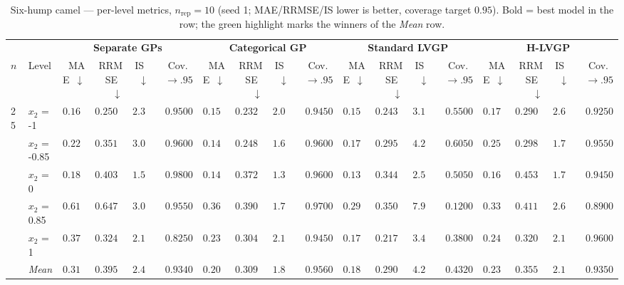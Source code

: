 \begin{table}[htbp]
\centering
\scriptsize
\setlength{\tabcolsep}{2.5pt}
\setlength{\fboxsep}{1pt}
\caption{Six-hump camel --- per-level metrics, $n_{\mathrm{rep}}=10$ (seed 1; MAE/RRMSE/IS lower is better, coverage target $0.95$). Bold = best model in the row; the green highlight marks the winners of the \emph{Mean} row.}
\label{tab:sixhump_camel_nrep10}
\begin{tabular}{llrrrrrrrrrrrrrrrr}
\toprule
 & & \multicolumn{4}{c}{\textbf{Separate GPs}} & \multicolumn{4}{c}{\textbf{Categorical GP}} & \multicolumn{4}{c}{\textbf{Standard LVGP}} & \multicolumn{4}{c}{\textbf{H-LVGP}} \\
\cmidrule(lr){3-6} \cmidrule(lr){7-10} \cmidrule(lr){11-14} \cmidrule(lr){15-18}
$n$ & Level & MAE~$\downarrow$ & RRMSE~$\downarrow$ & IS~$\downarrow$ & Cov.~$\to.95$ & MAE~$\downarrow$ & RRMSE~$\downarrow$ & IS~$\downarrow$ & Cov.~$\to.95$ & MAE~$\downarrow$ & RRMSE~$\downarrow$ & IS~$\downarrow$ & Cov.~$\to.95$ & MAE~$\downarrow$ & RRMSE~$\downarrow$ & IS~$\downarrow$ & Cov.~$\to.95$ \\
\midrule
\multirow{6}{*}{25} & $x_2$ = -1 & $0.1689$ & $0.2501$ & $2.355$ & {\boldmath$0.9500$} & {\boldmath$0.1501$} & {\boldmath$0.2320$} & {\boldmath$2.095$} & $0.9450$ & $0.1532$ & $0.2434$ & $3.163$ & $0.5500$ & $0.1713$ & $0.2904$ & $2.601$ & $0.9250$ \\
 & $x_2$ = -0.85 & $0.2249$ & $0.3515$ & $3.078$ & $0.9600$ & {\boldmath$0.1495$} & {\boldmath$0.2485$} & {\boldmath$1.687$} & $0.9600$ & $0.1706$ & $0.2957$ & $4.223$ & $0.6050$ & $0.2511$ & $0.2988$ & $1.745$ & {\boldmath$0.9550$} \\
 & $x_2$ = 0 & $0.1822$ & $0.4036$ & $1.563$ & $0.9800$ & $0.1426$ & $0.3728$ & {\boldmath$1.343$} & $0.9600$ & {\boldmath$0.1337$} & {\boldmath$0.3440$} & $2.544$ & $0.5050$ & $0.1679$ & $0.4539$ & $1.749$ & {\boldmath$0.9450$} \\
 & $x_2$ = 0.85 & $0.6129$ & $0.6476$ & $3.049$ & {\boldmath$0.9550$} & $0.3698$ & $0.3904$ & {\boldmath$1.776$} & $0.9700$ & {\boldmath$0.2916$} & {\boldmath$0.3504$} & $7.908$ & $0.1200$ & $0.3352$ & $0.4118$ & $2.640$ & $0.8900$ \\
 & $x_2$ = 1 & $0.3711$ & $0.3243$ & $2.151$ & $0.8250$ & $0.2338$ & $0.3040$ & {\boldmath$2.104$} & {\boldmath$0.9450$} & {\boldmath$0.1729$} & {\boldmath$0.2178$} & $3.481$ & $0.3800$ & $0.2401$ & $0.3208$ & $2.156$ & $0.9600$ \\
 & \textit{Mean} & $0.3120$ & $0.3954$ & $2.439$ & $0.9340$ & $0.2092$ & $0.3095$ & \colorbox{green!20}{\boldmath$1.801$} & \colorbox{green!20}{\boldmath$0.9560$} & \colorbox{green!20}{\boldmath$0.1844$} & \colorbox{green!20}{\boldmath$0.2902$} & $4.264$ & $0.4320$ & $0.2331$ & $0.3552$ & $2.178$ & $0.9350$ \\

\end{tabular}
\end{table}
